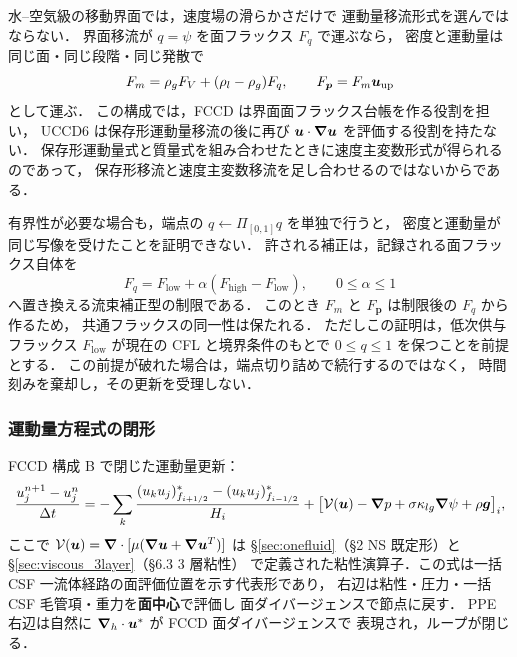 \begin{tcolorbox}[defbox, title={保存形共通フラックスとしての運動量移流}]
水--空気級の移動界面では，速度場の滑らかさだけで
運動量移流形式を選んではならない．
界面移流が $q=\psi$ を面フラックス $F_q$ で運ぶなら，
密度と運動量は同じ面・同じ段階・同じ発散で
\[
  F_m=\rho_gF_V+(\rho_l-\rho_g)F_q,\qquad
  F_{\bm{p}}=F_m\bm{u}_{\mathrm{up}}
\]
として運ぶ．
この構成では，FCCD は界面面フラックス台帳を作る役割を担い，
UCCD6 は保存形運動量移流の後に再び
$\bm{u}\cdot\bm{\nabla}\bm{u}$ を評価する役割を持たない．
保存形運動量式と質量式を組み合わせたときに速度主変数形式が得られるのであって，
保存形移流と速度主変数移流を足し合わせるのではないからである．

有界性が必要な場合も，端点の
$q\leftarrow\Pi_{[0,1]}q$ を単独で行うと，
密度と運動量が同じ写像を受けたことを証明できない．
許される補正は，記録される面フラックス自体を
\[
  F_q=F_{\mathrm{low}}+\alpha(F_{\mathrm{high}}-F_{\mathrm{low}}),
  \qquad 0\le\alpha\le1
\]
へ置き換える流束補正型の制限である．
このとき $F_m$ と $F_{\bm{p}}$ は制限後の $F_q$ から作るため，
共通フラックスの同一性は保たれる．
ただしこの証明は，低次供与フラックス
$F_{\mathrm{low}}$ が現在の CFL と境界条件のもとで
$0\le q\le1$ を保つことを前提とする．
この前提が破れた場合は，端点切り詰めで続行するのではなく，
時間刻みを棄却し，その更新を受理しない．
\end{tcolorbox}

\subsubsection{運動量方程式の閉形}
\label{sec:fccd_adv_closure}

FCCD 構成 B で閉じた運動量更新：
\begin{equation}
  \frac{u^{n+1}_j - u^n_j}{\Delta t}
  = -\sum_k\frac{(u_k u_j)^{*}_{f_{i+1/2}} - (u_k u_j)^{*}_{f_{i-1/2}}}{H_i}
  + \bigl[\mathcal{V}(\bm{u}) - \bm{\nabla} p + \sigma\kappa_{lg}\bm{\nabla}\psi + \rho\bm{g}\bigr]_i,
  \label{eq:fccd_adv_closure}
\end{equation}
ここで $\mathcal{V}(\bm{u})=\bm{\nabla}\cdot[\mu(\bm{\nabla}\bm{u}+\bm{\nabla}\bm{u}^T)]$ は
§\ref{sec:onefluid}（§2 NS 既定形）と §\ref{sec:viscous_3layer}（§6.3 3 層粘性）
で定義された粘性演算子．この式は一括 CSF 一流体経路の面評価位置を示す代表形であり，
右辺は粘性・圧力・一括 CSF 毛管項・重力を\textbf{面中心}で評価し
面ダイバージェンスで節点に戻す．
PPE 右辺は自然に $\bm{\nabla}_h\cdot\bm{u}^*$ が FCCD 面ダイバージェンスで
表現され，ループが閉じる．

